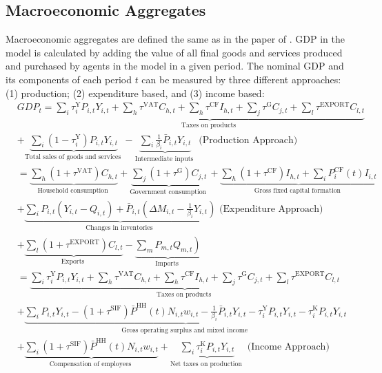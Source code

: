 \subsection{Macroeconomic Aggregates}
Macroeconomic aggregates are defined the same as in the paper of \cite{poledna_economic_2019}. GDP in the model is calculated by adding the value of all final goods and services produced and purchased by agents in the model in a given period. The nominal GDP and its components of each period $t$ can be measured by three different approaches: (1) production; (2) expenditure based, and (3) income based:
\begin{equation}
    \begin{aligned}
& G D P_t=\underbrace{\sum_i \tau_i^{\mathrm{Y}} P_{i,t} Y_{i,t}+\sum_h \tau^{\mathrm{VAT}} C_{h,t}+\sum_h \tau^{\mathrm{CF}} I_{h,t}+\sum_j \tau^{\mathrm{G}} C_{j,t}+\sum_l \tau^{\mathrm{EXPORT}} C_{l,t}}_{\text {Taxes on products }} \\
& +\underbrace{\sum_i\left(1-\tau_i^{\mathrm{Y}}\right) P_{i,t} Y_{i,t}}_{\text {Total sales of goods and services }}-\underbrace{\sum_i \frac{1}{\beta_i} \bar{P}_{i,t} Y_{i,t}}_{\text {Intermediate inputs }} \text{ (Production Approach)}\\
& =\underbrace{\sum_h\left(1+\tau^{\mathrm{VAT}}\right) C_{h,t}}_{\text {Household consumption }}+\underbrace{\sum_j\left(1+\tau^{\mathrm{G}}\right) C_{j,t}}_{\text {Government consumption }}+\underbrace{\sum_h\left(1+\tau^{\mathrm{CF}}\right) I_{h,t}+\sum_i P_i^{\mathrm{CF}}(t) I_{i,t}}_{\text {Gross fixed capital formation }} \\
& +\underbrace{\sum_i P_{i,t}\left(Y_{i,t}-Q_{i,t}\right)+\bar{P}_{i,t}\left(\Delta M_{i,t}-\frac{1}{\beta_i} Y_{i,t}\right)}_{\text {Changes in inventories }} \text{ (Expenditure Approach)} \\
& +\underbrace{\sum_l\left(1+\tau^{\mathrm{EXPORT}}\right) C_{l,t}}_{\text {Exports }}-\underbrace{\left.\sum_m P_{m,t} Q_{m,t}\right)}_{\text {Imports }} \\
& =\underbrace{\sum_i \tau_i^{\mathrm{Y}} P_{i,t} Y_{i,t}+\sum_h \tau^{\mathrm{VAT}} C_{h,t}+\sum_h \tau^{\mathrm{CF}} I_{h,t}+\sum_j \tau^{\mathrm{G}} C_{j,t}+\sum_l \tau^{\mathrm{EXPORT}} C_{l,t}}_{\text {Taxes on products }} \\
& +\underbrace{\sum_i P_{i,t} Y_{i,t}-\left(1+\tau^{\mathrm{SIF}}\right) \bar{P}^{\mathrm{HH}}(t) N_{i,t} w_{i,t}-\frac{1}{\beta_i} \bar{P}_{i,t} Y_{i,t}-\tau_i^{\mathrm{Y}} P_{i,t} Y_{i,t}-\tau_i^{\mathrm{K}} P_{i,t} Y_{i,t}}_{\text {Gross operating surplus and mixed income }} \\
& +\underbrace{\sum_i\left(1+\tau^{\mathrm{SIF}}\right) \bar{P}^{\mathrm{HH}}(t) N_{i,t} w_{i,t}}_{\text {Compensation of employees }}+\underbrace{\sum_i \tau_i^{\mathrm{K}} P_{i,t} Y_{i,t}}_{\text {Net taxes on production }} \text{ (Income Approach)}\\
&
\end{aligned}
\end{equation}
